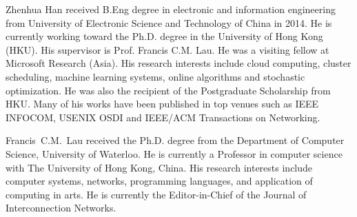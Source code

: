 \begin{IEEEbiography}{Zhenhua Han}
    received B.Eng degree in electronic and information engineering from University of Electronic Science and Technology of China in 2014. He is currently working toward the Ph.D. degree in the University of Hong Kong (HKU). His supervisor is Prof. Francis C.M. Lau. He was a visiting fellow at Microsoft Research (Asia). His research interests include cloud computing, cluster scheduling, machine learning systems, online algorithms and stochastic optimization. He was also the recipient of the Postgraduate Scholarship from HKU. Many of his works have been published in top venues such as IEEE INFOCOM, USENIX OSDI and IEEE/ACM Transactions on Networking.
\end{IEEEbiography}
\vspace{-1cm}

\begin{IEEEbiography}{Francis~C.M.~Lau}
    received the Ph.D. degree from the Department of Computer Science, University of Waterloo. He is currently a Professor in computer science with The University of Hong Kong, China. His research interests include computer systems, networks, programming languages, and application of computing in arts. He is currently the Editor-in-Chief of the Journal of Interconnection Networks.
\end{IEEEbiography}
\vspace{-1cm}
